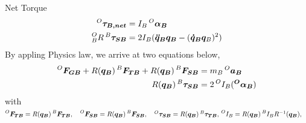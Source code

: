 Net Torque
\begin{align*}
  \prescript{O}{}{\bm{\tau_{B, net}}} &= I_B \prescript{O}{}{\bm{\alpha_B}} \\
  \prescript{O}{B}{R} \prescript{B}{}{\bm{\tau_{SB}}} &= 2I_B(\bm{\ddot{q}_B} \bm{q_B} - (\bm{\dot{q}_B} \bm{q}_B)^2)
\end{align*}
By appling Physics law, we arrive at two equations below,
\begin{align}
  \prescript{O}{}{\bm{F_{GB}}} + R(\bm{q_B}) \prescript{B}{}{\bm{F_{TB}}} + R(\bm{q_B}) \prescript{B}{}{\bm{F_{SB}}} &= m_B \prescript{O}{}{\bm{{a}_B}} \\  
  R(\bm{q_B}) \prescript{B}{}{\bm{\tau_{SB}}} &= 2\prescript{O}{}{I_B}(\bm{\prescript{O}{}{\alpha_{B}}})  
\end{align}
with $\prescript{O}{}{\bm{F_{TB}}} = R(\bm{q_B}) \prescript{B}{}{\bm{F_{TB}}}, \quad
\prescript{O}{}{\bm{F_{SB}}} = R(\bm{q_B}) \prescript{B}{}{\bm{F_{SB}}}, \quad
\prescript{O}{}{\bm{\tau_{SB}}} = R(\bm{q_B}) \prescript{B}{}{\bm{\tau_{TB}}}, \quad \\
\prescript{O}{}{I_{B}}= R(\bm{q_B}) \prescript{B}{}{I_{B}} R^{-1}(\bm{q_B}), \quad
$


